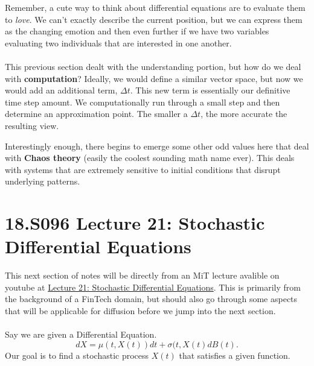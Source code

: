 \documentclass[10pt, oneside]{report}
\begin{document}
Remember, a cute way to think about differential equations are to evaluate them to \textit{love}.  We can't exactly describe the current position, but we can express them as the changing emotion and then even further if we have two variables evaluating two individuals that are interested in one another. 
\\
\\
This previous section dealt with the understanding portion, but how do we deal with \textbf{computation}?  Ideally, we would define a similar vector space, but now we would add an additional term, $\Delta t$.  This new term is essentially our definitive time step amount.  We computationally run through a small step and then determine an approximation point.  The smaller a $\Delta t$, the more accurate the resulting view.  

Interestingly enough, there begins to emerge some other odd values here that deal with \textbf{Chaos theory} (easily the coolest sounding math name ever).  This deals with systems that are extremely sensitive to initial conditions that disrupt underlying patterns.

\section{18.S096 Lecture 21: Stochastic Differential Equations}
This next section of notes will be directly from an MiT lecture avalible on youtube at \href{https://www.youtube.com/watch?v=qdbkvD4N-us}{Lecture 21: Stochastic Differential Equations}.  This is primarily from the background of a FinTech domain, but should also go through some aspects that will be applicable for diffusion before we jump into the next section.
\\
\\
Say we are given a Differential Equation.  
\[
    dX = \mu(t, X(t))dt + \sigma(t, X(t) dB(t)
.\] 
Our goal is to find a stochastic process $X(t)$ that satisfies a given function.  
\end{document}
